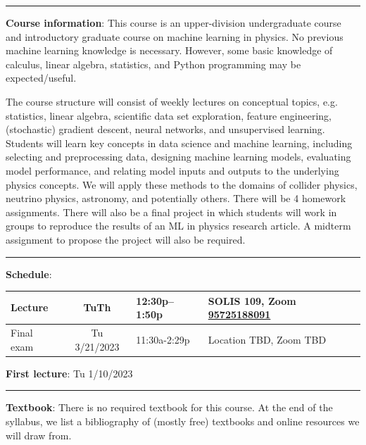 \documentclass[12pt]{article}
\begin{document}
\begin{center}
	\rule{\textwidth}{0.5pt}
\end{center}

\noindent\textbf{Course information}: This course is an upper-division undergraduate course and introductory graduate course on machine learning in physics.
No previous machine learning knowledge is necessary.
However, some basic knowledge of calculus, linear algebra, statistics, and Python programming may be expected/useful.

The course structure will consist of weekly lectures on conceptual topics, e.g. statistics, linear algebra, scientific data set exploration, feature engineering, (stochastic) gradient descent, neural networks, and unsupervised learning.
Students will learn key concepts in data science and machine learning, including selecting and preprocessing data, designing machine learning models, evaluating model performance, and relating model inputs and outputs to the underlying physics concepts.
We will apply these methods to the domains of collider physics, neutrino physics, astronomy, and potentially others.
There will be 4 homework assignments.
There will also be a final project in which students will work in groups to reproduce the results of an ML in physics research article.
A midterm assignment to propose the project will also be required.

\begin{center}
	\rule{\textwidth}{0.5pt}
\end{center}

\noindent\textbf{Schedule}:
\begin{center}
	\begin{tabular}{|l|c|l|m{60mm}|}
		\hline
		Lecture    & TuTh         & 12:30p--1:50p & SOLIS 109, Zoom \href{https://ucsd.zoom.us/j/95725188091}{95725188091} \\\hline
		Final exam & Tu 3/21/2023 & 11:30a-2:29p  & Location TBD, Zoom TBD                                                 \\\hline
	\end{tabular}
\end{center}

\noindent\textbf{First lecture}: Tu 1/10/2023

\begin{center}
	\rule{\textwidth}{0.5pt}
\end{center}

\noindent\textbf{Textbook}: There is no required textbook for this course.
At the end of the syllabus, we list a bibliography of (mostly free) textbooks and online resources we will draw from.
\end{document}
